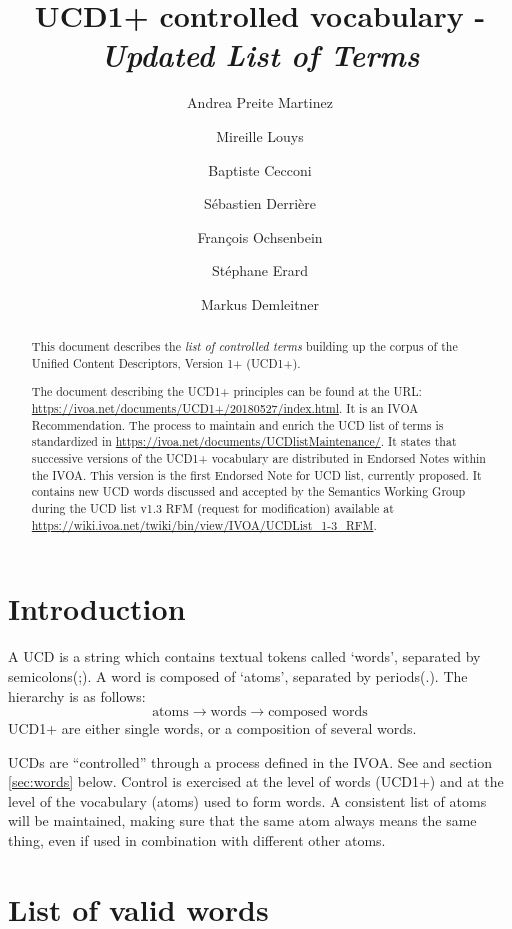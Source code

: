 \documentclass[11pt,a4paper]{ivoa}
\title{UCD1+ controlled vocabulary - \emph{Updated List of Terms}}
\author{Andrea Preite Martinez}
\author{Mireille Louys}
\author{Baptiste Cecconi}
\author{S\'ebastien Derri\`ere}
\author{Fran\c cois Ochsenbein}
\author{St\'ephane Erard}
\author{Markus Demleitner}
\begin{document}
\begin{abstract}
This document describes the \emph{list of controlled terms}  building up the corpus of the Unified Content Descriptors, Version 1+ (UCD1+). 

The document describing the UCD1+ principles can be found at the URL: \url{https://ivoa.net/documents/UCD1+/20180527/index.html}. 
It is an IVOA Recommendation. 
The process to maintain and enrich the UCD list of terms is standardized in  \url{https://ivoa.net/documents/UCDlistMaintenance/}.
It states that successive versions of the UCD1+ vocabulary are distributed in Endorsed Notes within the IVOA.
This version is the first Endorsed Note for UCD list, currently proposed. 
It contains new UCD words discussed and accepted by the Semantics Working Group during the UCD list v1.3 RFM (request for modification) available at \url{https://wiki.ivoa.net/twiki/bin/view/IVOA/UCDList_1-3_RFM}.

\end{abstract} 

\section{Introduction}

A UCD is a string which contains textual tokens called `words', separated by semicolons(;). A word is composed of 
`atoms', separated by periods(.). The hierarchy is as follows: 
$$
\textrm{atoms} \rightarrow \textrm{words} \rightarrow \textrm{composed words}
$$
UCD1+ are either single words, or a composition of several words.

UCDs are ``controlled'' through a process defined in the IVOA. See \citet{2005ivoa.spec.0819D} and section \ref{sec:words} below. 
Control is exercised at the level of words (UCD1+) and at the level of the vocabulary (atoms) used to form words. A 
consistent list of atoms will be maintained, making sure that the same atom always means the same thing, even if used 
in combination with different other atoms. 


\section{List of valid words}
\label{sec:list}
\end{document}
